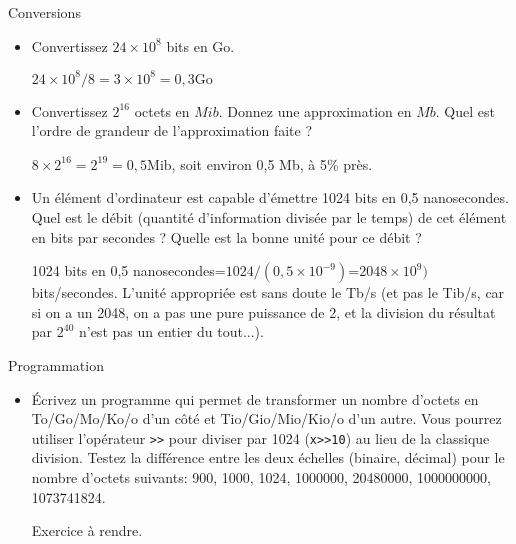 \begin{exercice}
  \begin{exercicelet}{Conversions}
    \begin{itemize}
    \item Convertissez $24\times 10^8$ bits en $\mathrm{Go}$.
      \begin{correction} $24\times 10^8/8=3\times 10^8=0,3 \mathrm{Go}$
      \end{correction}
    \item Convertissez $2^{16}$ octets en $Mib$. Donnez une approximation en
      $Mb$. Quel est l'ordre de grandeur de l'approximation faite ?
      \begin{correction} $8\times2^{16}=2^{19}=0,5 \mathrm{Mib}$, soit
        environ 0,5 Mb, à 5\% près.
      \end{correction}
    \item Un élément d'ordinateur est capable d'émettre 1024 bits en 0,5
      nanosecondes. Quel est le débit (quantité d'information divisée par le
      temps) de cet élément en bits par secondes ? Quelle est la bonne unité
      pour ce débit ?
      \begin{correction} 1024 bits en 0,5
        nanosecondes=$1024/(0,5\times10^{-9})$=$2048\times10^{9})$
        bits/secondes. L'unité appropriée est sans doute le Tb/s (et pas le
        Tib/s, car si on a un 2048, on a pas une pure puissance de 2, et la
        division du résultat par $2^{40}$ n'est pas un entier du tout...).
      \end{correction}
    \end{itemize}
  \end{exercicelet}
  \begin{exercicelet}{Programmation}
    \begin{itemize}
    \item[\ddialoghome] Écrivez un programme qui permet de transformer un nombre
      d'octets en To/Go/Mo/Ko/o d'un côté et Tio/Gio/Mio/Kio/o d'un
      autre. Vous pourrez utiliser l'opérateur \verb|>>| pour diviser par
      1024 (\verb|x>>10|) au lieu de la classique division. Testez la
      différence entre les deux échelles (binaire, décimal) pour le nombre
      d'octets suivants: 900, 1000, 1024, 1000000, 20480000, 1000000000,
      1073741824.
      \begin{correction}
        Exercice à rendre.
      \end{correction}
    \end{itemize}
  \end{exercicelet}
\end{exercice}
